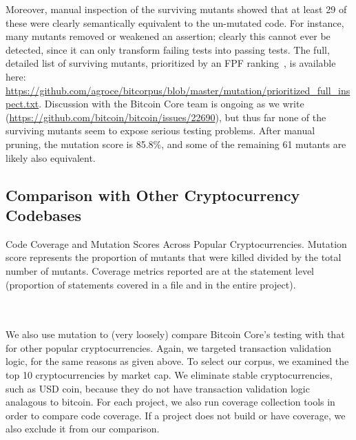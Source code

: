 Moreover, manual inspection of the surviving mutants showed that at
least 29 of these were clearly semantically equivalent to the
un-mutated code.  For instance, many mutants removed or weakened an
assertion; clearly this cannot ever be detected, since it can only
transform failing tests into passing tests.  The full, detailed list
of surviving mutants, prioritized by an FPF ranking~\cite{10.1145/2491956.2462173,Gonzalez85}, is
available here:
\url{https://github.com/agroce/bitcorpus/blob/master/mutation/prioritized_full_inspect.txt}.
Discussion with the Bitcoin Core team is ongoing as we write
(\url{https://github.com/bitcoin/bitcoin/issues/22690}), but thus far
none of the surviving mutants seem to expose serious testing
problems.  After manual pruning, the mutation score is 85.8\%, and
some of the remaining 61 mutants are likely also equivalent.

\subsection{Comparison with Other Cryptocurrency Codebases}

\begin{table}[ht!]
\vspace{2mm}

\caption{Code Coverage and Mutation Scores Across Popular Cryptocurrencies. Mutation score represents the proportion of mutants that were killed divided by the total number of mutants. Coverage
metrics reported are at the statement level (proportion of statements covered in a file and in the entire project).
\\ 
\\ 
\\ 
}
\label{tab:comparison}
\end{table}

We also use mutation to (very loosely) compare Bitcoin Core's testing
with that for other popular cryptocurrencies. Again, we targeted
transaction validation logic, for the same reasons as given above. To select
our corpus, we examined the top 10 cryptocurrencies by market cap. We eliminate stable cryptocurrencies, such as USD coin,
because they do not have transaction validation logic analagous to bitcoin. For each project, we also run coverage collection
tools in order to compare code coverage. If a project does not build or have coverage, we also exclude it from our comparison.

